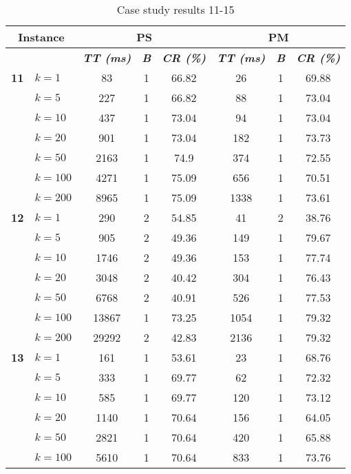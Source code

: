    \begin{table}[htbp]
    \caption{Case study results 11-15}
    \centering
    \begin{tabular}{|l|l|c|c|c|c|c|c|}
    \hline
    \multicolumn{ 2}{|c|}{\textbf{Instance}} & \multicolumn{ 3}{c|}{\textbf{PS}} & \multicolumn{ 3}{c|}{\textbf{PM}} \\ \hline
    \multicolumn{ 2}{|l|}{} & \textbf{\textit{TT (ms)}} & \textbf{\textit{B}} & \textbf{\textit{CR (\%)}} & \textbf{\textit{TT (ms)}} & \textbf{\textit{B}} & \textbf{\textit{CR (\%)}} \\ \hline
    \multicolumn{1}{|r|}{\textbf{11}} & $k=1$ & 83 & 1 & 66.82 & 26 & 1 & 69.88 \\ 
     & $k=5$ & 227 & 1 & 66.82 & 88 & 1 & 73.04 \\ 
     & $k=10$ & 437 & 1 & 73.04 & 94 & 1 & 73.04 \\ 
     & $k=20$ & 901 & 1 & 73.04 & 182 & 1 & 73.73 \\ 
     & $k=50$ & 2163 & 1 & 74.9 & 374 & 1 & 72.55 \\ 
     & $k=100$ & 4271 & 1 & 75.09 & 656 & 1 & 70.51 \\ 
     & $k=200$ & 8965 & 1 & 75.09 & 1338 & 1 & 73.61 \\ \hline
    \multicolumn{1}{|r|}{\textbf{12}} & $k=1$ & 290 & 2 & 54.85 & 41 & 2 & 38.76 \\ 
     & $k=5$ & 905 & 2 & 49.36 & 149 & 1 & 79.67 \\ 
     & $k=10$ & 1746 & 2 & 49.36 & 153 & 1 & 77.74 \\ 
     & $k=20$ & 3048 & 2 & 40.42 & 304 & 1 & 76.43 \\ 
     & $k=50$ & 6768 & 2 & 40.91 & 526 & 1 & 77.53 \\ 
     & $k=100$ & 13867 & 1 & 73.25 & 1054 & 1 & 79.32 \\ 
     & $k=200$ & 29292 & 2 & 42.83 & 2136 & 1 & 79.32 \\ \hline
    \multicolumn{1}{|r|}{\textbf{13}} & $k=1$ & 161 & 1 & 53.61 & 23 & 1 & 68.76 \\ 
     & $k=5$ & 333 & 1 & 69.77 & 62 & 1 & 72.32 \\ 
     & $k=10$ & 585 & 1 & 69.77 & 120 & 1 & 73.12 \\ 
     & $k=20$ & 1140 & 1 & 70.64 & 156 & 1 & 64.05 \\ 
     & $k=50$ & 2821 & 1 & 70.64 & 420 & 1 & 65.88 \\ 
     & $k=100$ & 5610 & 1 & 70.64 & 833 & 1 & 73.76 \\ 

\end{tabular}
\end{table}
